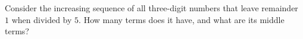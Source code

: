 Consider the increasing sequence of all three-digit numbers that leave remainder $1$ when divided by $5$. How many terms does it have, and what are its middle terms?
